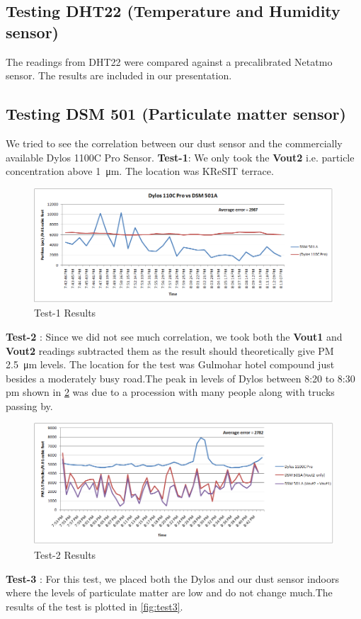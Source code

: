 \documentclass[a4paper,12pt]{article}
\begin{document}
\subsection{Testing DHT22 (Temperature and Humidity sensor)}
The readings from DHT22 were compared against a precalibrated Netatmo sensor. The results are included in our presentation.
\subsection{Testing DSM 501 (Particulate matter sensor)}
We tried to see the correlation between our dust sensor and the commercially available Dylos 1100C Pro Sensor.
\newline \textbf{Test-1}: We only took the \textbf{Vout2} i.e. particle concentration above \SI{1}{\micro\metre}. The location was KReSIT terrace.
\begin{figure}[!ht]
	\centering
	\includegraphics[scale=0.5]{dsm_test_1.png}
	\caption{Test-1 Results}
	\label{fig:test1}
\end{figure}
\newline\textbf{Test-2} : Since we did not see much correlation, we took both the \textbf{Vout1} and \textbf{Vout2} readings subtracted them as the result should theoretically give PM \SI{2.5}{\micro\metre} levels. The location for the test was Gulmohar hotel compound just besides a moderately busy road.The peak in levels of Dylos between 8:20 to 8:30 pm shown in \ref{fig:test2} was due to a procession with many people along with trucks passing by.
\begin{figure}[!ht]
	\centering
	\includegraphics[scale=0.5]{dsm_test_2.png}
	\caption{Test-2 Results}
	\label{fig:test2}
\end{figure}
\newline\textbf{Test-3} : For this test, we placed both the Dylos and our dust sensor indoors where the levels of particulate matter are low and do not change much.The results of the test is plotted in \ref{fig:test3}. \\
\end{document}
